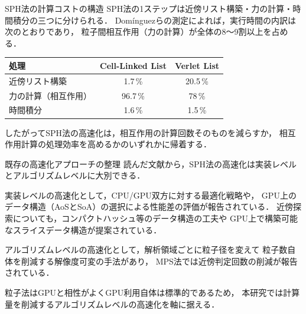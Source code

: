\documentclass[aspectratio=169,11pt]{beamer}
\begin{document}
\begin{frame}{SPH法の計算コストの構造}
  SPH法の1ステップは近傍リスト構築・力の計算・時間積分の三つに分けられる．
  Domínguezらの測定によれば，実行時間の内訳は次のとおりであり，
  \alert{粒子間相互作用（力の計算）が全体の8〜9割以上を占める}\cite{dominguez2010}．

  \vspace{0.8em}
  \begin{center}
    \begin{tabular}{lcc}
      \toprule
      処理 & Cell-Linked List & Verlet List \\
      \midrule
      近傍リスト構築 & 1.7\,\% & 20.5\,\% \\
      力の計算（相互作用） & \alert{96.7\,\%} & \alert{78\,\%} \\
      時間積分 & 1.6\,\% & 1.5\,\% \\
      \bottomrule
    \end{tabular}
  \end{center}

  \vspace{0.8em}
  したがってSPH法の高速化は，相互作用の計算回数そのものを減らすか，
  相互作用計算の処理効率を高めるかのいずれかに帰着する．
\end{frame}

\begin{frame}{既存の高速化アプローチの整理}
  読んだ文献から，SPH法の高速化は実装レベルとアルゴリズムレベルに大別できる．

  \vspace{0.8em}
  実装レベルの高速化として，CPU/GPU双方に対する最適化戦略\cite{dominguez2013}や，
  GPU上のデータ構造（AoSとSoA）の選択による性能差の評価\cite{jsces2023}が報告されている．
  近傍探索についても，コンパクトハッシュ等のデータ構造の工夫\cite{ihmsen2011}や
  GPU上で構築可能なスライスデータ構造\cite{harada2007slice}が提案されている．

  \vspace{0.8em}
  アルゴリズムレベルの高速化として，解析領域ごとに粒子径を変えて
  粒子数自体を削減する解像度可変の手法があり，
  MPS法では近傍判定回数の削減が報告されている\cite{ishii2024}．

  \vspace{0.8em}
  粒子法はGPUと相性がよくGPU利用自体は標準的であるため，
  本研究では\alert{計算量を削減するアルゴリズムレベルの高速化}を軸に据える．
\end{frame}
\end{document}
